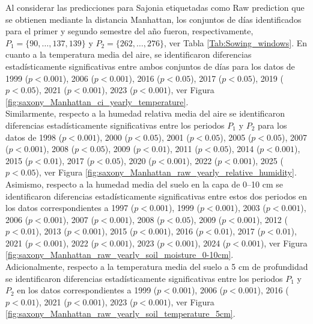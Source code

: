 Al considerar las predicciones para Sajonia etiquetadas como Raw prediction que se obtienen mediante la distancia Manhattan,  los conjuntos de días identificados para el primer y segundo semestre del año fueron, respectivamente, $P_1=\{90,\ldots, 137, 139\}$ y $P_2=\{262,\ldots,276\}$, ver Tabla \ref{Tab:Sowing_windows}. En cuanto a la temperatura media del aire, se identificaron diferencias estadísticamente significativas entre ambos conjuntos de días para los datos de 1999	($p<0.001$), 2006	($p<0.001$), 2016	($p<0.05$), 2017	($p<0.05$), 2019	($p<0.05$), 2021	($p<0.001$), 2023	($p<0.001$), ver Figura \ref{fig:saxony_Manhattan_ci_yearly_temperature}.\\


Similarmente, respecto a la humedad relativa media del aire se identificaron diferencias estadísticamente significativas entre los periodos $P_1$ y $P_2$ para los datos de 1998	($p<0.001$), 2000	($p<0.05$), 2001	($p<0.05$), 2005	($p<0.05$), 2007	($p<0.001$), 2008	($p<0.05$), 2009	($p<0.01$), 2011	($p<0.05$), 2014	($p<0.001$), 2015	($p<0.01$), 2017	($p<0.05$), 2020	($p<0.001$), 2022	($p<0.001$), 2025	($p<0.05$), ver Figura \ref{fig:saxony_Manhattan_raw_yearly_relative_humidity}.\\

Asimismo, respecto a la humedad media del suelo en la capa de 0--10 cm se identificaron diferencias estadísticamente significativas entre estos dos periodos en los datos correspondientes a 1997	($p<0.001$), 1999	($p<0.001$), 2003	($p<0.001$), 2006	($p<0.001$), 2007	($p<0.001$), 2008	($p<0.05$), 2009	($p<0.001$), 2012	($p<0.01$), 2013	($p<0.001$), 2015	($p<0.001$), 2016	($p<0.01$), 2017	($p<0.01$), 2021	($p<0.001$), 2022	($p<0.001$), 2023	($p<0.001$), 2024	($p<0.001$), ver Figura \ref{fig:saxony_Manhattan_raw_yearly_soil_moisture_0-10cm}.\\

Adicionalmente, respecto a la temperatura media del suelo a 5 cm de profundidad se identificaron diferencias estadísticamente significativas entre los periodos $P_1$ y $P_2$ en los datos correspondientes a 1999	($p<0.001$), 2006	($p<0.001$), 2016	($p<0.01$), 2021	($p<0.001$), 2023	($p<0.001$), ver Figura \ref{fig:saxony_Manhattan_raw_yearly_soil_temperature_5cm}.\\

